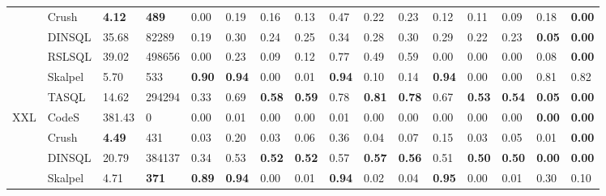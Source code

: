 \begin{table*}
\begin{tabular}{llllllllllllllll}
 & Crush & \textbf{4.12} & \textbf{489} & 0.00 & 0.19 & 0.16 & 0.13 & 0.47 & 0.22 & 0.23 & 0.12 & 0.11 & 0.09 & 0.18 & \textbf{0.00} \\
 & DINSQL & 35.68 & 82289 & 0.19 & 0.30 & 0.24 & 0.25 & 0.34 & 0.28 & 0.30 & 0.29 & 0.22 & 0.23 & \textbf{0.05} & \textbf{0.00} \\
 & RSLSQL & 39.02 & 498656 & 0.00 & 0.23 & 0.09 & 0.12 & 0.77 & 0.49 & 0.59 & 0.00 & 0.00 & 0.00 & 0.08 & \textbf{0.00} \\
 & Skalpel & 5.70 & 533 & \textbf{0.90} & \textbf{0.94} & 0.00 & 0.01 & \textbf{0.94} & 0.10 & 0.14 & \textbf{0.94} & 0.00 & 0.00 & 0.81 & 0.82 \\
 & TASQL & 14.62 & 294294 & 0.33 & 0.69 & \textbf{0.58} & \textbf{0.59} & 0.78 & \textbf{0.81} & \textbf{0.78} & 0.67 & \textbf{0.53} & \textbf{0.54} & \textbf{0.05} & \textbf{0.00} \\
\cline{1-16}
\multirow[t]{4}{*}{XXL} & CodeS & 381.43 & 0 & 0.00 & 0.01 & 0.00 & 0.00 & 0.01 & 0.00 & 0.00 & 0.00 & 0.00 & 0.00 & \textbf{0.00} & \textbf{0.00} \\
 & Crush & \textbf{4.49} & 431 & 0.03 & 0.20 & 0.03 & 0.06 & 0.36 & 0.04 & 0.07 & 0.15 & 0.03 & 0.05 & 0.01 & \textbf{0.00} \\
 & DINSQL & 20.79 & 384137 & 0.34 & 0.53 & \textbf{0.52} & \textbf{0.52} & 0.57 & \textbf{0.57} & \textbf{0.56} & 0.51 & \textbf{0.50} & \textbf{0.50} & \textbf{0.00} & \textbf{0.00} \\
 & Skalpel & 4.71 & \textbf{371} & \textbf{0.89} & \textbf{0.94} & 0.00 & 0.01 & \textbf{0.94} & 0.02 & 0.04 & \textbf{0.95} & 0.00 & 0.01 & 0.30 & 0.10 \\
\cline{1-16}
\bottomrule
\end{tabular}
\end{table*}
